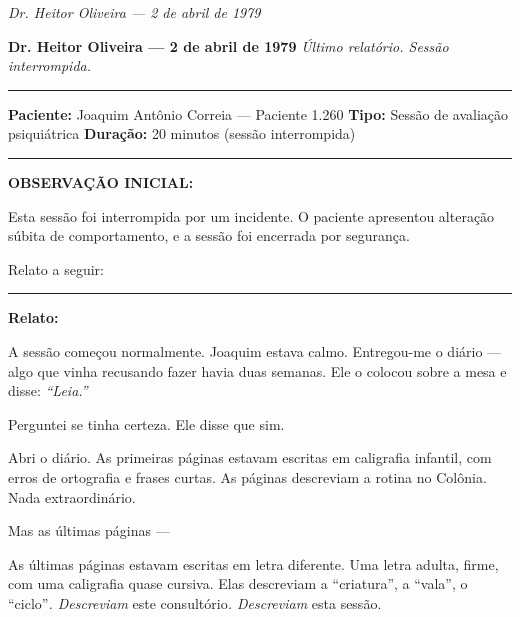 
\noindent \textit{Dr. Heitor Oliveira --- 2 de abril de 1979}

\noindent \textbf{Dr. Heitor Oliveira --- 2 de abril de 1979}
\textit{Último relatório. Sessão interrompida.}

\vspace{0.5em}\noindent\rule{\textwidth}{0.5pt}\vspace{0.5em}

\noindent \textbf{Paciente:} Joaquim Antônio Correia --- Paciente 1.260
\textbf{Tipo:} Sessão de avaliação psiquiátrica
\textbf{Duração:} 20 minutos (sessão interrompida)

\vspace{0.5em}\noindent\rule{\textwidth}{0.5pt}\vspace{0.5em}

\noindent \textbf{OBSERVAÇÃO INICIAL:}

\noindent Esta sessão foi interrompida por um incidente. O paciente apresentou alteração súbita de comportamento, e a sessão foi encerrada por segurança.

\noindent Relato a seguir:

\vspace{0.5em}\noindent\rule{\textwidth}{0.5pt}\vspace{0.5em}

\noindent \textbf{Relato:}

\noindent A sessão começou normalmente. Joaquim estava calmo. Entregou-me o diário --- algo que vinha recusando fazer havia duas semanas. Ele o colocou sobre a mesa e disse: \textit{\textquotedblleft{}Leia.\textquotedblright{}}

\noindent Perguntei se tinha certeza. Ele disse que sim.

\noindent Abri o diário. As primeiras páginas estavam escritas em caligrafia infantil, com erros de ortografia e frases curtas. As páginas descreviam a rotina no Colônia. Nada extraordinário.

\noindent Mas as últimas páginas ---

\noindent As últimas páginas estavam escritas em letra diferente. Uma letra adulta, firme, com uma caligrafia quase cursiva. Elas descreviam a \textquotedblleft{}criatura\textquotedblright{}, a \textquotedblleft{}vala\textquotedblright{}, o \textquotedblleft{}ciclo\textquotedblright{\textit{. Descreviam }este consultório\textit{. Descreviam }esta sessão}.

